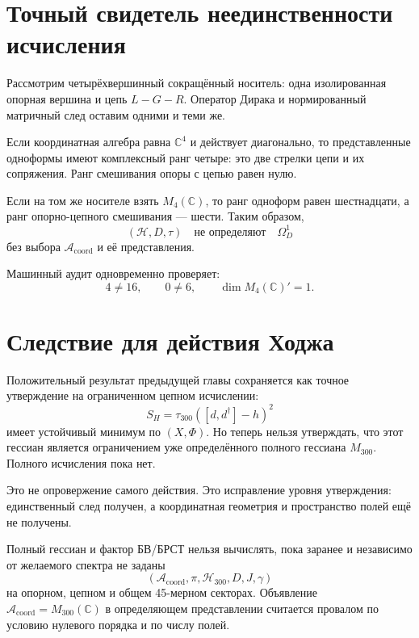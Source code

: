 \section{Точный свидетель неединственности исчисления}

Рассмотрим четырёхвершинный сокращённый носитель: одна изолированная
опорная вершина и цепь $L-G-R$. Оператор Дирака и нормированный матричный
след оставим одними и теми же.

Если координатная алгебра равна $\mathbb C^4$ и действует диагонально, то
представленные одноформы имеют комплексный ранг четыре: это две стрелки
цепи и их сопряжения. Ранг смешивания опоры с цепью равен нулю.

Если на том же носителе взять $M_4(\mathbb C)$, то ранг одноформ равен
шестнадцати, а ранг опорно-цепного смешивания --- шести. Таким образом,
\begin{equation}
 (\mathcal H,D,\tau)
 \quad\text{не определяют}\quad
 \Omega_D^1
\end{equation}
без выбора $\mathcal A_{\mathrm{coord}}$ и её представления.

Машинный аудит одновременно проверяет:
\begin{equation}
 4\ne16,
 \qquad 0\ne6,
 \qquad \dim M_4(\mathbb C)'=1.
\end{equation}

\section{Следствие для действия Ходжа}

Положительный результат предыдущей главы сохраняется как точное
утверждение на ограниченном цепном исчислении:
\begin{equation}
 S_H=\tau_{300}([d,d^\dagger]-h)^2
\end{equation}
имеет устойчивый минимум по $(X,\Phi)$. Но теперь нельзя утверждать, что
этот гессиан является ограничением уже определённого полного гессиана
$M_{300}$. Полного исчисления пока нет.

Это не опровержение самого действия. Это исправление уровня утверждения:
единственный след получен, а координатная геометрия и пространство полей
ещё не получены.

\begin{nogocriterion}
Полный гессиан и фактор БВ/БРСТ нельзя вычислять, пока заранее и независимо
от желаемого спектра не заданы
\begin{equation}
 (\mathcal A_{\mathrm{coord}},\pi,\mathcal H_{300},D,J,\gamma)
\end{equation}
на опорном, цепном и общем 45-мерном секторах. Объявление
$\mathcal A_{\mathrm{coord}}=M_{300}(\mathbb C)$ в определяющем
представлении считается провалом по условию нулевого порядка и по числу
полей.
\end{nogocriterion}

